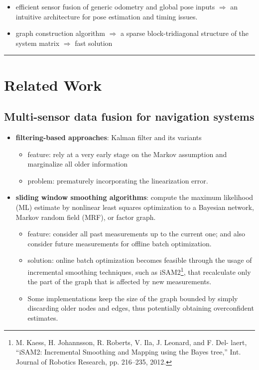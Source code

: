 \documentclass[letterpaper,11pt]{article}
\begin{document}
\begin{itemize}
	\item efficient sensor fusion of generic odometry and global pose inputs $\Rightarrow$ an intuitive architecture for pose estimation and timing issues.
	\item graph construction algorithm $\Rightarrow$ a sparse block-tridiagonal structure of the system matrix $\Rightarrow$ fast solution
\end{itemize}

\begin{center}\rule{\textwidth}{1pt}\end{center}
\section{Related Work}

\subsection{Multi-sensor data fusion for navigation systems}

\begin{itemize}
	\item \textbf{filtering-based approaches}: Kalman filter and its variants
	\begin{itemize}
		\item feature: rely at a very early stage on the Markov assumption and marginalize all older information
		\item problem: prematurely incorporating the linearization error.
	\end{itemize}
	\item \textbf{sliding window smoothing algorithms}: compute the maximum likelihood (ML) estimate by nonlinear least squares optimization to a Bayesian network, Markov random field (MRF), or factor graph.
	\begin{itemize}
		\item feature: consider all past measurements up to the current one; and also consider future measurements for offline batch optimization.
		\item solution: online batch optimization becomes feasible through the usage of incremental smoothing techniques, such as iSAM2\footnote{M. Kaess, H. Johannsson, R. Roberts, V. Ila, J. Leonard, and F. Del- laert, “iSAM2: Incremental Smoothing and Mapping using the Bayes tree,” Int. Journal of Robotics Research, pp. 216–235, 2012.}, that recalculate only the part of the graph that is affected by new measurements.
		\item Some implementations keep the size of the graph bounded by simply discarding older nodes and edges, thus potentially obtaining overconfident estimates.
	\end{itemize}
\end{itemize}
\end{document}
